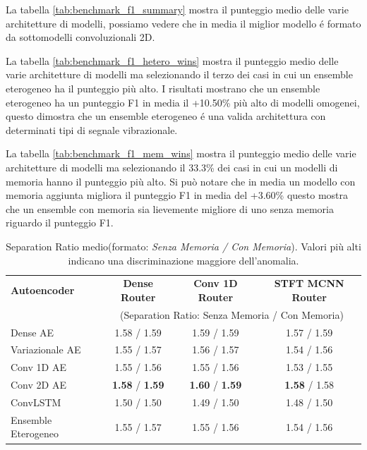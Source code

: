 La tabella \ref{tab:benchmark_f1_summary} mostra il punteggio medio delle varie architetture di modelli, possiamo vedere che in media il  miglior modello é formato da sottomodelli convoluzionali 2D.

La tabella \ref{tab:benchmark_f1_hetero_wins} mostra il punteggio medio delle varie architetture di modelli ma selezionando il terzo dei casi in cui un ensemble eterogeneo ha il punteggio più alto. I risultati mostrano che un ensemble eterogeneo ha un punteggio F1 in media il +10.50\% più alto di modelli omogenei, questo dimostra che un ensemble eterogeneo é una valida architettura con determinati tipi di segnale vibrazionale.

La tabella \ref{tab:benchmark_f1_mem_wins} mostra il punteggio medio delle varie architetture di modelli ma selezionando il 33.3\% dei casi in cui un modelli di memoria hanno il punteggio più alto. Si può notare che in media un modello con memoria aggiunta migliora il punteggio F1 in media del +3.60\% questo mostra che un ensemble con memoria sia lievemente migliore di uno senza memoria riguardo il punteggio F1.

\begin{table}[H]
	\centering
	\begin{tabular}{lccc}
		\toprule
		\textbf{Autoencoder} & \textbf{Dense Router} & \textbf{Conv 1D Router} & \textbf{STFT MCNN Router} \\
		& \multicolumn{3}{c}{\small (Separation Ratio: Senza Memoria / Con Memoria)} \\
		\midrule
		Dense AE            & 1.58 / 1.59 & 1.59 / 1.59 & 1.57 / 1.59 \\
		Variazionale AE     & 1.55 / 1.57 & 1.56 / 1.57 & 1.54 / 1.56 \\
		Conv 1D AE          & 1.55 / 1.56 & 1.55 / 1.56 & 1.53 / 1.55 \\
		Conv 2D AE          & \textbf{1.58} / \textbf{1.59} & \textbf{1.60} / \textbf{1.59} & \textbf{1.58} / 1.58 \\
		ConvLSTM            & 1.50 / 1.50 & 1.49 / 1.50 & 1.48 / 1.50 \\
		Ensemble Eterogeneo & 1.55 / 1.57 & 1.55 / 1.56 & 1.54 / 1.56 \\
		\bottomrule
	\end{tabular}
	\caption{Separation Ratio medio(formato: \emph{Senza Memoria / Con Memoria}). Valori più alti indicano una discriminazione maggiore dell'anomalia.}
	\label{tab:benchmark_separation_summary}
\end{table}


